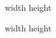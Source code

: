 %
\ifx\fmtname\undefined
  
  \def\fmtname{basic}
  \expandafter\dump
\fi


\pdfximage width \hsize height 
\hbox{\pdfrefximage\pdflastximage}
\eject

\pdfximage width \hsize height 
\hbox{\pdfrefximage\pdflastximage}
\eject

\bye
